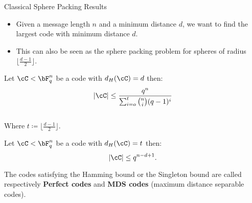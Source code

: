 \begin{frame}{Classical Sphere Packing Results}
\begin{itemize}
    \item Given a message length \(n\) and a minimum distance \(d\), we want to find the largest code with minimum distance \(d\). \\
    \item This can also be seen as the sphere packing problem for spheres of radius \(\lfloor \frac{d-1}{2}\rfloor\). 
\end{itemize}
\quad

\begin{theorem} \label{hamming}
    Let \(\cC < \bF_q^n \) be a code with \(d_H(\cC) = d\) then:
\[|\cC|\leq \frac{q^n}{\sum_{i=o}^t\binom{n}{i}(q-1)^i}\] \\

Where \(t \coloneqq \lfloor \frac{d-1}{2}\rfloor \).
\end{theorem}

\begin{theorem} \label{singleton}
Let \(\cC < \bF_q^n \) be a code with \(d_H(\cC) = t\) then: \[ |\cC| \leq q^{n-d+1}.\] 
\end{theorem}
\vspace{0.5cm}
The codes satisfying the Hamming bound or the Singleton bound are called respectively \textbf{Perfect codes} and \textbf{MDS codes} (maximum distance separable codes).


              


\end{frame}
